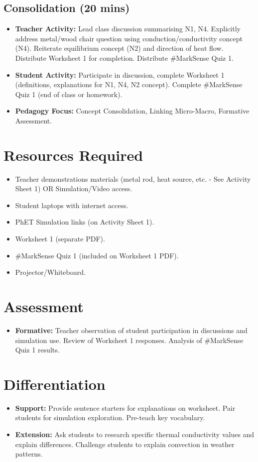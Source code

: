 \documentclass[11pt, a4paper]{article}
\begin{document}
\subsection*{Consolidation (20 mins)}
\begin{itemize}
    \item \textbf{Teacher Activity:} Lead class discussion summarising N1, N4. Explicitly address metal/wood chair question using conduction/conductivity concept (N4). Reiterate equilibrium concept (N2) and direction of heat flow. Distribute Worksheet 1 for completion. Distribute \#MarkSense Quiz 1.
    \item \textbf{Student Activity:} Participate in discussion, complete Worksheet 1 (definitions, explanations for N1, N4, N2 concept). Complete \#MarkSense Quiz 1 (end of class or homework).
    \item \textbf{Pedagogy Focus:} Concept Consolidation, Linking Micro-Macro, Formative Assessment.
\end{itemize}

\section*{Resources Required}
\begin{itemize}
    \item Teacher demonstrations materials (metal rod, heat source, etc. - See Activity Sheet 1) OR Simulation/Video access.
    \item Student laptops with internet access.
    \item PhET Simulation links (on Activity Sheet 1).
    \item Worksheet 1 (separate PDF).
    \item \#MarkSense Quiz 1 (included on Worksheet 1 PDF).
    \item Projector/Whiteboard.
\end{itemize}

\section*{Assessment}
\begin{itemize}
    \item \textbf{Formative:} Teacher observation of student participation in discussions and simulation use. Review of Worksheet 1 responses. Analysis of \#MarkSense Quiz 1 results.
\end{itemize}

\section*{Differentiation}
\begin{itemize}
    \item \textbf{Support:} Provide sentence starters for explanations on worksheet. Pair students for simulation exploration. Pre-teach key vocabulary.
    \item \textbf{Extension:} Ask students to research specific thermal conductivity values and explain differences. Challenge students to explain convection in weather patterns.
\end{itemize}
\end{document}

